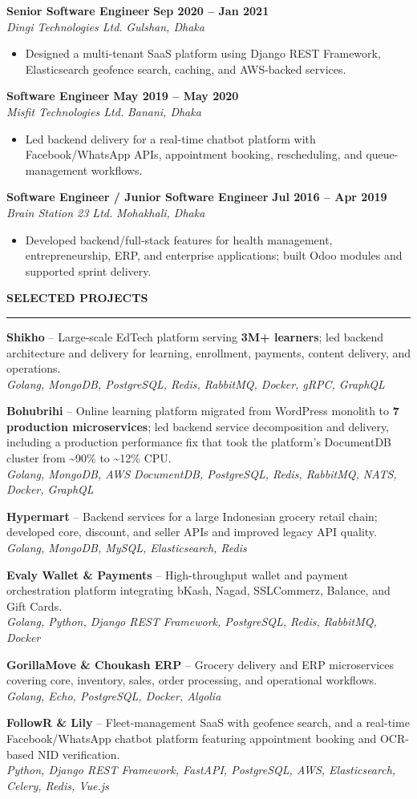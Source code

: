 \documentclass[10pt,a4paper]{article}
\newcommand{\cvsection}[1]{%
  \vspace{0.55em}
  {\normalsize\bfseries\MakeUppercase{#1}}\par
  \vspace{0.12em}\hrule\vspace{0.28em}
}
\newcommand{\roleentry}[4]{%
  \textbf{#1} \hfill \textbf{#2}\\
  \textit{#3} \hfill \textit{#4}\par\vspace{-0.12em}
}
\newcommand{\projectentry}[3]{%
  \textbf{#1} -- #2\\
  \textit{#3}\par\vspace{0.12em}
}
\newenvironment{cvitems}{%
  \begin{itemize}
    \setlength{\itemsep}{0.03em}
    \setlength{\parskip}{0pt}
    \setlength{\parsep}{0pt}
    \setlength{\topsep}{0.08em}
    \setlength{\leftmargin}{1.2em}
}{\end{itemize}}
\begin{document}
\roleentry{Senior Software Engineer}{Sep 2020 -- Jan 2021}{Dingi Technologies Ltd.}{Gulshan, Dhaka}
\begin{cvitems}
  \item Designed a multi-tenant SaaS platform using Django REST Framework, Elasticsearch geofence search, caching, and AWS-backed services.
\end{cvitems}

\roleentry{Software Engineer}{May 2019 -- May 2020}{Misfit Technologies Ltd.}{Banani, Dhaka}
\begin{cvitems}
  \item Led backend delivery for a real-time chatbot platform with Facebook/WhatsApp APIs, appointment booking, rescheduling, and queue-management workflows.
\end{cvitems}

\roleentry{Software Engineer / Junior Software Engineer}{Jul 2016 -- Apr 2019}{Brain Station 23 Ltd.}{Mohakhali, Dhaka}
\begin{cvitems}
  \item Developed backend/full-stack features for health management, entrepreneurship, ERP, and enterprise applications; built Odoo modules and supported sprint delivery.
\end{cvitems}

\cvsection{Selected Projects}
\projectentry{Shikho}{Large-scale EdTech platform serving \textbf{3M+ learners}; led backend architecture and delivery for learning, enrollment, payments, content delivery, and operations.}{Golang, MongoDB, PostgreSQL, Redis, RabbitMQ, Docker, gRPC, GraphQL}
\projectentry{Bohubrihi}{Online learning platform migrated from WordPress monolith to \textbf{7 production microservices}; led backend service decomposition and delivery, including a production performance fix that took the platform's DocumentDB cluster from \textasciitilde{}90\% to \textasciitilde{}12\% CPU.}{Golang, MongoDB, AWS DocumentDB, PostgreSQL, Redis, RabbitMQ, NATS, Docker, GraphQL}
\projectentry{Hypermart}{Backend services for a large Indonesian grocery retail chain; developed core, discount, and seller APIs and improved legacy API quality.}{Golang, MongoDB, MySQL, Elasticsearch, Redis}
\projectentry{Evaly Wallet \& Payments}{High-throughput wallet and payment orchestration platform integrating bKash, Nagad, SSLCommerz, Balance, and Gift Cards.}{Golang, Python, Django REST Framework, PostgreSQL, Redis, RabbitMQ, Docker}
\projectentry{GorillaMove \& Choukash ERP}{Grocery delivery and ERP microservices covering core, inventory, sales, order processing, and operational workflows.}{Golang, Echo, PostgreSQL, Docker, Algolia}
\projectentry{FollowR \& Lily}{Fleet-management SaaS with geofence search, and a real-time Facebook/WhatsApp chatbot platform featuring appointment booking and OCR-based NID verification.}{Python, Django REST Framework, FastAPI, PostgreSQL, AWS, Elasticsearch, Celery, Redis, Vue.js}
\end{document}
